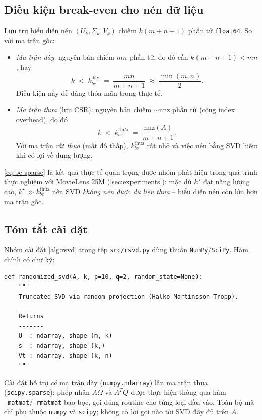 \subsection{Điều kiện break-even cho nén dữ liệu}\label{subsec:break-even}

Lưu trữ biểu diễn nén $(U_k, \Sigma_k, V_k)$ chiếm $k(m + n + 1)$ phần tử
\texttt{float64}. So với ma trận gốc:

\begin{itemize}
    \item \emph{Ma trận dày}: nguyên bản chiếm $mn$ phần tử, do đó cần
    $k(m+n+1) < mn$, hay
    \begin{equation}\label{eq:be-dense}
        k \;<\; k_{be}^{\text{dày}} \;=\; \frac{mn}{m + n + 1}
        \;\approx\; \frac{\min(m, n)}{2}.
    \end{equation}
    Điều kiện này dễ dàng thỏa mãn trong thực tế.

    \item \emph{Ma trận thưa} (lưu CSR): nguyên bản chiếm
    $\sim \mathrm{nnz}$ phần tử (cộng index overhead), do đó
    \begin{equation}\label{eq:be-sparse}
        k \;<\; k_{be}^{\text{thưa}} \;=\; \frac{\mathrm{nnz}(A)}{m + n + 1}.
    \end{equation}
    Với ma trận \emph{rất thưa} (mật độ thấp), $k_{be}^{\text{thưa}}$ rất nhỏ
    và việc nén bằng SVD hiếm khi có lợi về dung lượng.
\end{itemize}

\eqref{eq:be-sparse} là kết quả thực tế quan trọng được nhóm phát hiện trong
quá trình thực nghiệm với MovieLens 25M (\cref{sec:experiments}): mặc dù
$k^\star$ đạt năng lượng cao, $k^\star \gg k_{be}^{\text{thưa}}$ nên SVD
\emph{không nén được dữ liệu thưa} -- biểu diễn nén còn lớn hơn ma trận gốc.

\subsection{Tóm tắt cài đặt}\label{subsec:impl-summary}

Nhóm cài đặt \cref{alg:rsvd} trong tệp \texttt{src/rsvd.py} dùng thuần
\texttt{NumPy}/\texttt{SciPy}. Hàm chính có chữ ký:

\begin{lstlisting}[caption={Chữ ký hàm Randomized SVD tự cài
(\texttt{src/rsvd.py}).},label={lst:rsvd-api}]
def randomized_svd(A, k, p=10, q=2, random_state=None):
    """
    Truncated SVD via random projection (Halko-Martinsson-Tropp).

    Returns
    -------
    U  : ndarray, shape (m, k)
    s  : ndarray, shape (k,)
    Vt : ndarray, shape (k, n)
    """
\end{lstlisting}

Cài đặt hỗ trợ \emph{cả} ma trận dày (\texttt{numpy.ndarray}) lẫn ma trận thưa
(\texttt{scipy.sparse}): phép nhân $A\Omega$ và $A^T Q$ được thực hiện thông
qua hàm \texttt{\_matmat}/\texttt{\_rmatmat} bao bọc, gọi đúng routine cho
từng loại đầu vào. Toàn bộ mã chỉ phụ thuộc \texttt{numpy} và \texttt{scipy};
không có lời gọi nào tới SVD đầy đủ trên $A$.
